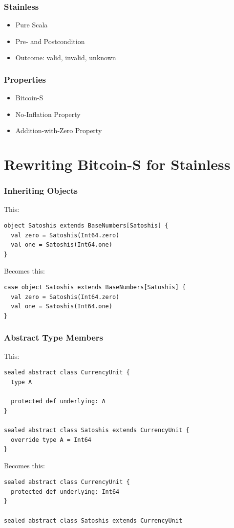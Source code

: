 \documentclass{beamer}
\begin{document}
\begin{frame}
\frametitle{Stainless}
\begin{itemize}
  \item Pure Scala
  \item Pre- and Postcondition
  \item Outcome: valid, invalid, unknown
\end{itemize}
\end{frame}


\begin{frame}
\frametitle{Properties}
\begin{itemize}
  \item Bitcoin-S
  \item No-Inflation Property
  \item Addition-with-Zero Property
\end{itemize}
\end{frame}


\section{Rewriting Bitcoin-S for Stainless}



\begin{frame}[fragile]
\frametitle{Inheriting Objects}
This:
\begin{lstlisting}[style=scala]
object Satoshis extends BaseNumbers[Satoshis] {
  val zero = Satoshis(Int64.zero)
  val one = Satoshis(Int64.one)
}
\end{lstlisting}

Becomes this:
\begin{lstlisting}[style=scala]
case object Satoshis extends BaseNumbers[Satoshis] {
  val zero = Satoshis(Int64.zero)
  val one = Satoshis(Int64.one)
}
\end{lstlisting}
\end{frame}


\begin{frame}[fragile]
\frametitle{Abstract Type Members}
This:
\begin{lstlisting}[style=scala]
sealed abstract class CurrencyUnit {
  type A

  protected def underlying: A
}

sealed abstract class Satoshis extends CurrencyUnit {
  override type A = Int64
}
\end{lstlisting}

Becomes this:
\begin{lstlisting}[style=scala]
sealed abstract class CurrencyUnit {
  protected def underlying: Int64
}

sealed abstract class Satoshis extends CurrencyUnit
\end{lstlisting}
\end{frame}
\end{document}
